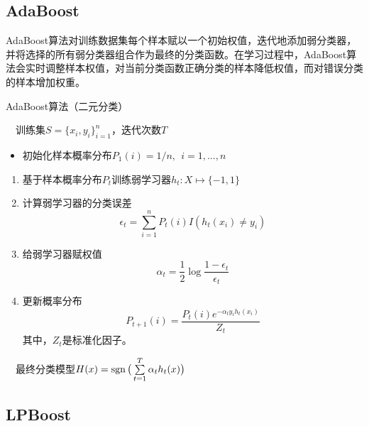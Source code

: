 \subsection{AdaBoost}
AdaBoost算法对训练数据集每个样本赋以一个初始权值，迭代地添加弱分类器，并将选择的所有弱分类器组合作为最终的分类函数。在学习过程中，AdaBoost算法会实时调整样本权值，对当前分类函数正确分类的样本降低权值，而对错误分类的样本增加权重。
\begin{algorithm}[htbp]
        \caption{AdaBoost算法（二元分类）}
        \begin{algorithmic}
            \REQUIRE ~~训练集$S=\{x_i,y_i\}_{i=1}^n$，迭代次数$T$\\
            \STATE
            \begin{itemize}
              \item 初始化样本概率分布$P_1(i)=1/n,~~i=1,\ldots,n$
            \end{itemize}
            \STATE
            \begin{enumerate}
              \item 基于样本概率分布$P_t$训练弱学习器$h_t:X\mapsto \{-1,1\}$
              \item 计算弱学习器的分类误差
              \begin{equation}
                \epsilon_t = \sum\limits_{i=1}^n P_t(i) I(h_t(x_i)\ne y_i)
              \end{equation}
              \item 给弱学习器赋权值
                \begin{equation}
                    \alpha_t=\frac{1}{2}\log\frac{1-\epsilon_t}{\epsilon_t}
                \end{equation}
              \item 更新概率分布
              \begin{equation}
                P_{t+1}(i) = \frac{P_t(i) e^{-\alpha_t y_i h_t(x_i)}}{Z_t}
              \end{equation}
              其中，$Z_t$是标准化因子。
            \end{enumerate}
            \ENDFOR
            \ENSURE ~~最终分类模型$H(x) = \operatorname{\mathrm{sgn}}\big(\sum\limits_{t=1}^T \alpha_t h_t(x)\big)$
        \end{algorithmic}
\end{algorithm}

\subsection{LPBoost}

